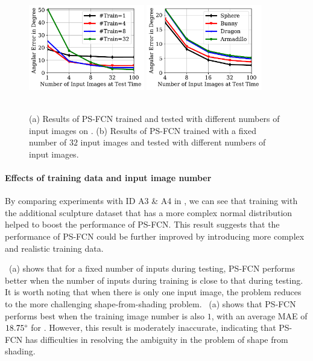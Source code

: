 \begin{figure}[htbp] \centering
    \includegraphics[width=0.45\textwidth]{ch-psfcn/images/Results/Synth_Test/train_normal_img_num_sensitivity_v3.pdf}
    \includegraphics[width=0.45\textwidth]{ch-psfcn/images/Results/Synth_Test/test_normal_img_num_sensitivity.pdf} 
    \\ \vspace{-0.5em}
     \\
    \caption[Effect of the input image number]{(a) Results of PS-FCN trained and tested with different numbers of input images on . (b) Results of PS-FCN trained with a fixed number of $32$ input images and tested with different numbers of input images.} 
    \label{fig:calib_img_num_syn}
\end{figure}

\paragraph{Effects of training data and input image number} 
By comparing experiments with ID A3 \& A4 in , we can see that training with the additional sculpture dataset that has a more complex normal distribution helped to boost the performance of PS-FCN. This result suggests that the performance of PS-FCN could be further improved by introducing more complex and realistic training data. 

~(a) shows that for a fixed number of inputs during testing, PS-FCN performs better when the number of inputs during training is close to that during testing. 
It is worth noting that when there is only one input image, the problem reduces to the more challenging shape-from-shading problem. ~(a) shows that PS-FCN performs best when the training image number is also $1$, with an average MAE of $18.75\degree$ for . However, this result is moderately inaccurate, indicating that PS-FCN has difficulties in resolving the ambiguity in the problem of shape from shading.


